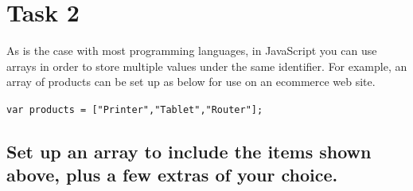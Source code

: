 \documentclass[a4paper]{article}
\begin{document}
\section{Task 2}
As is the case with most programming languages, in JavaScript you can use arrays in order to store multiple values under the same identifier. For example, an array of products can be set up as below for use on an ecommerce web site.\par
  \verb|var products = ["Printer","Tablet","Router"];|

\subsection{Set up an array to include the items shown above, plus a few extras of your choice.}
\end{document}
